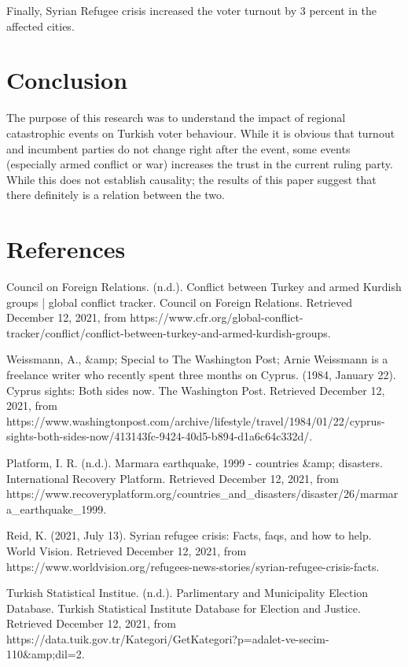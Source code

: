 \documentclass[12pt]{article}
\begin{document}
Finally, Syrian Refugee crisis increased the voter turnout by 3 percent in the affected cities. 

\section{Conclusion}

The purpose of this research was to understand the impact of regional catastrophic events on Turkish voter behaviour. While it is obvious that turnout and incumbent parties do not change right after the event, some events (especially armed conflict or war) increases the trust in the current ruling party.  While this does not establish causality; the results of this paper suggest that there definitely is a relation between the two.  

\section{References}
Council on Foreign Relations. (n.d.). Conflict between Turkey and armed Kurdish groups | global conflict tracker. Council on Foreign Relations. Retrieved December 12, 2021, from https://www.cfr.org/global-conflict-tracker/conflict/conflict-between-turkey-and-armed-kurdish-groups. 

Weissmann, A., &amp; Special to The Washington Post; Arnie Weissmann is a freelance writer who recently spent three months on Cyprus. (1984, January 22). Cyprus sights: Both sides now. The Washington Post. Retrieved December 12, 2021, from \\https://www.washingtonpost.com/archive/lifestyle/travel/1984/01/22/cyprus-sights-both-sides-now/413143fc-9424-40d5-b894-d1a6c64c332d/. 

Platform, I. R. (n.d.). Marmara earthquake, 1999 - countries &amp; disasters. International Recovery Platform. Retrieved December 12, 2021, from \\https://www.recoveryplatform.org/countries\_and\_disasters/disaster/26/marmara\_earthquake\_1999. 

Reid, K. (2021, July 13). Syrian refugee crisis: Facts, faqs, and how to help. World Vision. Retrieved December 12, 2021, from\\ https://www.worldvision.org/refugees-news-stories/syrian-refugee-crisis-facts. 

Turkish Statistical Institue. (n.d.). Parlimentary and Municipality Election Database. Turkish Statistical Institute Database for Election and Justice. Retrieved December 12, 2021, from https://data.tuik.gov.tr/Kategori/GetKategori?p=adalet-ve-secim-110&amp;dil=2. 
\end{document}
